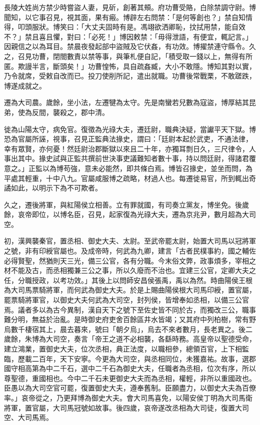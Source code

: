 \begin{pinyinscope}
長陵大姓尚方禁少時嘗盜人妻，見斫，創著其頰。府功曹受賂，白除禁調守尉。博聞知，以它事召見，視其面，果有瘢。博辟左右問禁：「是何等創也？」禁自知情得，叩頭服狀。博笑曰：「大丈夫固時有是。馮翊欲洒卿恥，抆拭用禁，能自效不？」禁且喜且懼，對曰：「必死！」博因敕禁：「毋得泄語，有便宜，輒記言。」因親信之以為耳目。禁晨夜發起部中盜賊及它伏姦，有功效。博擢禁連守縣令。久之，召見功曹，閉閤數責以禁等事，與筆札便自記，「積受取一錢以上，無得有所匿。欺謾半言，斷頭矣！」功曹惶怖，具自疏姦臧，大小不敢隱。博知其對以實，乃令就席，受敕自改而已。投刀使削所記，遣出就職。功曹後常戰栗，不敢蹉跌，博遂成就之。

遷為大司農。歲餘，坐小法，左遷犍為太守。先是南蠻若兒數為寇盜，博厚結其昆弟，使為反間，襲殺之，郡中清。

徙為山陽太守，病免官。復徵為光祿大夫，遷廷尉，職典決疑，當讞平天下獄。博恐為官屬所誣，視事，召見正監典法掾史，謂曰：「廷尉本起於武吏，不通法律，幸有眾賢，亦何憂！然廷尉治郡斷獄以來且二十年，亦獨耳剽日久，三尺律令，人事出其中。掾史試與正監共撰前世決事吏議難知者數十事，持以問廷尉，得諸君覆意之。」正監以為博苟強，意未必能然，即共條白焉。博皆召掾史，並坐而問，為平處其輕重，十中八九。官屬咸服博之疏略，材過人也。每遷徙易官，所到輒出奇譎如此，以明示下為不可欺者。

久之，遷後將軍，與紅陽侯立相善。立有罪就國，有司奏立黨友，博坐免。後歲餘，哀帝即位，以博名臣，召見，起家復為光祿大夫，遷為京兆尹，數月超為大司空。

初，漢興襲秦官，置丞相、御史大夫、太尉。至武帝罷太尉，始置大司馬以冠將軍之號，非有印綬官屬也。及成帝時，何武為九卿，建言「古者民樸事約，國之輔佐必得賢聖，然猶則天三光，備三公官，各有分職。今末俗文弊，政事煩多，宰相之材不能及古，而丞相獨兼三公之事，所以久廢而不治也。宜建三公官，定卿大夫之任，分職授政，以考功效。」其後上以問師安昌侯張禹，禹以為然。時曲陽侯王根為大司馬票騎將軍，而何武為御史大夫。於是上賜曲陽侯根大司馬印綬，置官屬，罷票騎將軍官，以御史大夫何武為大司空，封列侯，皆增奉如丞相，以備三公官焉。議者多以為古今異制，漢自天下之號下至佐史皆不同於古，而獨改三公，職事難分明，無益於治亂。是時御史府吏舍百餘區井水皆竭；又其府中列柏樹，常有野烏數千棲宿其上，晨去暮來，號曰「朝夕烏」，烏去不來者數月，長老異之。後二歲餘，朱博為大司空，奏言「帝王之道不必相襲，各繇時務。高皇帝以聖德受命，建立鴻業，置御史大夫，位次丞相，典正法度，以職相參，總領百官，上下相監臨，歷載二百年，天下安寧。今更為大司空，與丞相同位，未獲嘉祐。故事，選郡國守相高第為中二千石，選中二千石為御史大夫，任職者為丞相，位次有序，所以尊聖德，重國相也。今中二千石未更御史大夫而為丞相，權輕，非所以重國政也。臣愚以為大司空官可罷，復置御史大夫，遵奉舊制。臣願盡力，以御史大夫為百僚率。」哀帝從之，乃更拜博為御史大夫。會大司馬喜免，以陽安侯丁明為大司馬衛將軍，置官屬，大司馬冠號如故事。後四歲，哀帝遂改丞相為大司徒，復置大司空、大司馬焉。


\end{pinyinscope}
